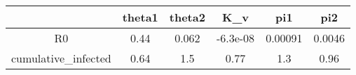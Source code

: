 \begin{tabular}{|c|c|c|c|c|c|}
\hline
& theta1 & theta2 & K_v & pi1 & pi2 \\
\hline
R0 & 0.44 & 0.062 & -6.3e-08 & 0.00091 & 0.0046 \\
\hline
cumulative_infected & 0.64 & 1.5 & 0.77 & 1.3 & 0.96 \\
\hline
\end{tabular}

